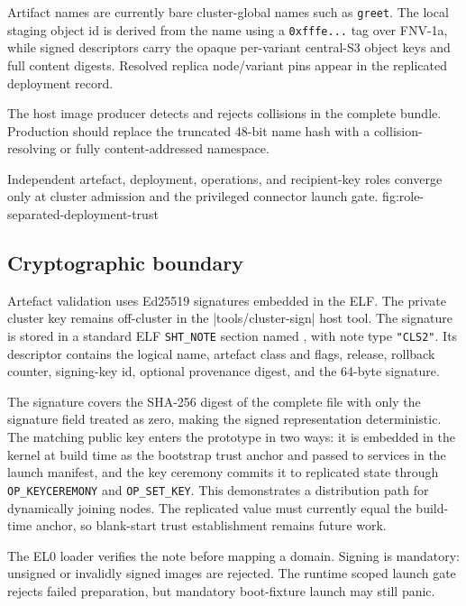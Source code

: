 Artifact names are currently bare cluster-global names such as
\texttt{greet}. The local staging object id is derived from the name using a
\texttt{0xfffe...} tag over FNV-1a, while signed descriptors carry the opaque
per-variant central-S3 object keys and full content digests. Resolved replica
node/variant pins appear in the replicated deployment record.

The host image producer detects and rejects collisions in the complete
bundle. Production should replace the truncated 48-bit name hash with a
collision-resolving or fully content-addressed namespace.

    {Independent artefact, deployment, operations, and recipient-key roles
    converge only at cluster admission and the privileged connector launch
    gate.}
    {fig:role-separated-deployment-trust}

\subsection{Cryptographic boundary}

Artefact validation uses Ed25519 signatures embedded in the ELF. The private
cluster key remains off-cluster in the
\repodir|tools/cluster-sign| host tool. The signature is stored in a standard
ELF \texttt{SHT\_NOTE} section named
, with note type \texttt{"CLS2"}. Its descriptor
contains the logical name, artefact class and flags, release, rollback
counter, signing-key id, optional provenance digest, and the 64-byte
signature.

The signature covers the SHA-256 digest of the complete file with only the
signature field treated as zero, making the signed representation
deterministic. The matching public key enters the prototype in two ways: it
is embedded in the kernel at build time as the bootstrap trust anchor and
passed to services in the launch manifest, and the key ceremony commits it
to replicated state through
\texttt{OP\_KEYCEREMONY} and \texttt{OP\_SET\_KEY}. This demonstrates a
distribution path for dynamically joining nodes. The replicated value must
currently equal the build-time anchor, so blank-start trust establishment remains
future work.

The EL0 loader verifies the note before mapping a domain. Signing is
mandatory: unsigned or invalidly signed images are rejected. The
runtime scoped launch gate rejects failed preparation, but mandatory boot-fixture
launch may still panic.

